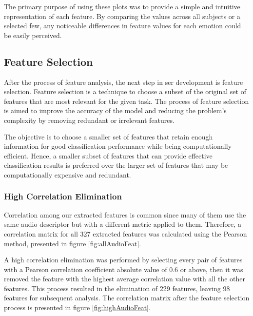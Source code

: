 The primary purpose of using these plots was to provide a simple and intuitive representation of each feature. By comparing the values across all subjects or a selected few, any noticeable differences in feature values for each emotion could be easily perceived.

\subsection{Feature Selection}

After the process of feature analysis, the next step in \ac{ser} development is feature selection. Feature selection is a technique to choose a subset of the original set of features that are most relevant for the given task. The process of feature selection is aimed to improve the accuracy of the model and reducing the problem's complexity by removing redundant or irrelevant features. 

The objective is to choose a smaller set of features that retain enough information for good classification performance while being computationally efficient. Hence, a smaller subset of features that can provide effective classification results is preferred over the larger set of features that may be computationally expensive and redundant.

\subsubsection{High Correlation Elimination}

Correlation among our extracted features is common since many of them use the same audio descriptor but with a different metric applied to them. Therefore, a correlation matrix for all 327 extracted features was calculated using the Pearson method, presented in figure \ref{fig:allAudioFeat}.

A high correlation elimination was performed by selecting every pair of features with a Pearson correlation coefficient absolute value of 0.6 or above, then it was removed the feature with the highest average correlation value with all the other features. This process resulted in the elimination of 229 features, leaving 98 features for subsequent analysis. The correlation matrix after the feature selection process is presented in figure \ref{fig:highAudioFeat}.


